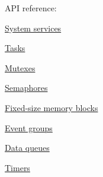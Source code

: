 A\+P\+I reference\+:


\begin{DoxyItemize}
\item \hyperlink{tn__sys_8h}{System services}
\item \hyperlink{tn__tasks_8h}{Tasks}
\item \hyperlink{tn__mutex_8h}{Mutexes}
\item \hyperlink{tn__sem_8h}{Semaphores}
\item \hyperlink{tn__fmem_8h}{Fixed-\/size memory blocks}
\item \hyperlink{tn__eventgrp_8h}{Event groups}
\item \hyperlink{tn__dqueue_8h}{Data queues}
\item \hyperlink{tn__timer_8h}{Timers} 
\end{DoxyItemize}